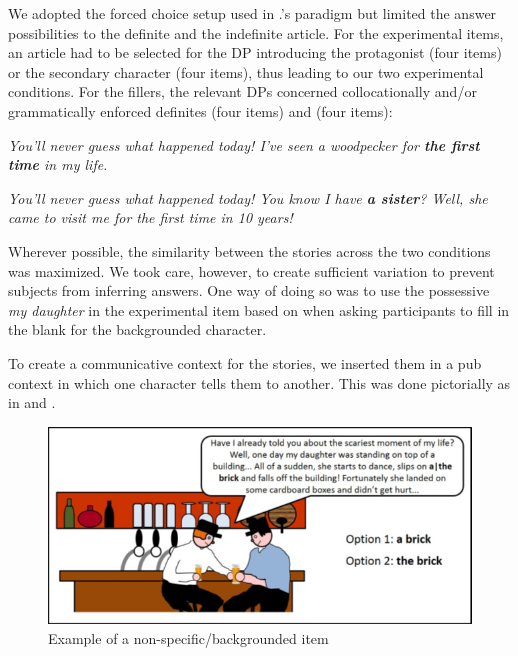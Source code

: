 \documentclass[output=paper,
modfonts
]{langscibook}
\begin{document}
We adopted the forced choice setup used in \citeauthor{IoninKoWexler2004}.’s  paradigm but limited the answer possibilities to the definite and the indefinite article. For the experimental items, an article had to be selected for the DP introducing the protagonist (four items) or the secondary character (four items), thus leading to our two experimental conditions. For the fillers, the relevant DPs concerned collocationally and/or grammatically enforced definites (four items) and  (four items):

\ea\label{ex:lebruyn:4}
\textit{You’ll never guess what happened today! I’ve seen a woodpecker for \textbf{the first time} in my life.}
\z 

\ea\label{ex:lebruyn:5}
\textit{You’ll never guess what happened today! You know I have \textbf{a sister}? Well, she came to visit 	me for the first time in 10 years!}
\z 

Wherever possible, the similarity between the stories across the two conditions was maximized. We took care, however, to create sufficient variation to prevent subjects from inferring answers. One way of doing so was to use the possessive \textit{my daughter} in the experimental item based on  when asking participants to fill in the blank for the backgrounded character.

To create a communicative context for the stories, we inserted them in a pub context in which one character tells them to another. This was done pictorially as in  and .

\begin{figure}[h]
\includegraphics[height=.25\textheight]{figures/fig1.png}
\caption{Example of a non-specific/backgrounded item}
\label{fig:lebruyn:1}
\end{figure}
\end{document}

